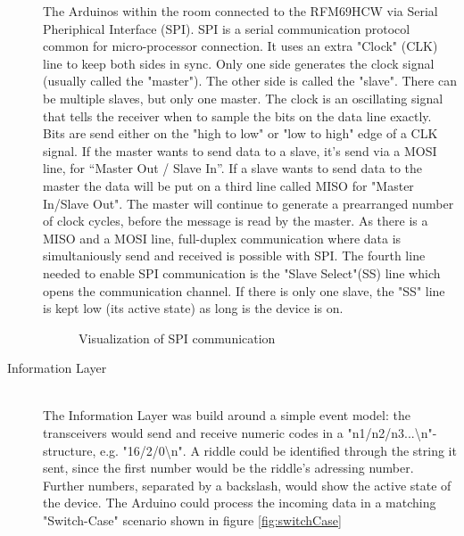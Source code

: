 \begin{description}
          The Arduinos within the room connected to the RFM69HCW via Serial Pheriphical Interface (SPI).
          SPI is a serial communication protocol common for micro-processor connection. 
          It uses an extra "Clock" (CLK) line to keep both sides in sync. 
          Only one side generates the clock signal (usually called the "master"). The other side is called the "slave".
          There can be multiple slaves, but only one master.
          The clock is an oscillating signal that tells 
          the receiver when to sample the bits on the data line exactly. 
          Bits are send either on the "high to low" or "low to high" edge of a CLK signal.
          If the master wants to send data to a slave, it's send via a MOSI line, for “Master Out / Slave In”.
          If a slave wants to send data to the master the data will be put on a third line called MISO for "Master In/Slave Out".
          The master will continue to generate a prearranged number of clock cycles, before the message is read by the master.
          As there is a MISO and a MOSI line, full-duplex communication where data is simultaniously send and received is possible with SPI.
          The fourth line needed to enable SPI communication is the "Slave Select"(SS) line which opens the communication channel. 
          If there is only one slave, the "SS" line is kept low (its active state) as long is the device is on. 

          \begin{figure*}[h]
            \centering
            \caption{Visualization of SPI communication}
          \end{figure*}
          
	\item[Information Layer]\hfill \\
        The Information Layer was build around a simple event model: the transceivers would send and receive numeric codes in a "n1/n2/n3...\textbackslash n"-structure, e.g. "16/2/0\textbackslash n". 
        A riddle could be identified through the string it sent, since the first number would be the riddle's adressing number. 
        Further numbers, separated by a backslash, would show the active state of the device. 
        The Arduino could process the incoming data in a matching "Switch-Case" scenario shown in figure \ref{fig:switchCase}


\end{description}
